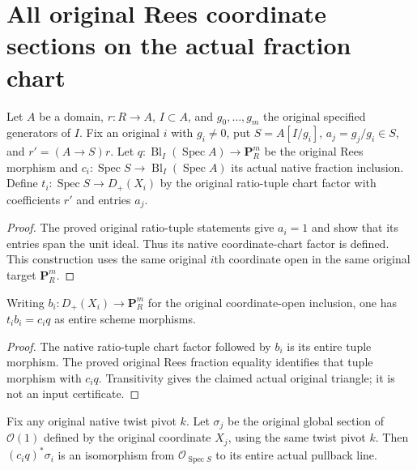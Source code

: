 \section{All original Rees coordinate sections on the actual fraction chart}
\begin{definition}
\label{def:whole-original-fraction-projective-factor}
\leanok
Let $A$ be a domain, $r:R\to A$, $I\subset A$, and $g_0,\ldots,g_m$ the original
specified generators of $I$. Fix an original $i$ with $g_i\ne0$, put
$S=A[I/g_i]$, $a_j=g_j/g_i\in S$, and $r'=(A\to S)r$.
Let $q:\operatorname{Bl}_I(\operatorname{Spec}A)\to\mathbf P_R^m$ be the original
Rees morphism and $c_i:\operatorname{Spec}S\to\operatorname{Bl}_I(\operatorname{Spec}A)$
its actual native fraction inclusion. Define $t_i:\operatorname{Spec}S\to D_+(X_i)$
by the original ratio-tuple chart factor with coefficients $r'$ and entries $a_j$.
\end{definition}
\begin{proof}
The proved original ratio-tuple statements give $a_i=1$ and show that its
entries span the unit ideal. Thus its native coordinate-chart factor is defined. This construction uses the same original $i$th coordinate
open in the same original target $\mathbf P_R^m$.
\end{proof}
\begin{proposition}
\label{prop:whole-original-fraction-projective-factor-triangle}
\leanok
Writing $b_i:D_+(X_i)\to\mathbf P_R^m$ for the original coordinate-open inclusion,
one has $t_i b_i=c_iq$ as entire scheme morphisms.
\end{proposition}
\begin{proof}
The native ratio-tuple chart factor followed by $b_i$ is its entire tuple
morphism. The proved original Rees fraction equality identifies
that tuple morphism with $c_iq$. Transitivity gives the claimed actual original
triangle; it is not an input certificate.
\end{proof}
\begin{proposition}
\label{prop:whole-original-fraction-projective-pivot-basis}
\leanok
Fix any original native twist pivot $k$. Let $\sigma_j$ be the original global
section of $\mathcal O(1)$ defined by the original coordinate $X_j$, using the
same twist pivot $k$. Then $(c_iq)^*\sigma_i$ is an isomorphism from
$\mathcal O_{\operatorname{Spec}S}$ to its entire actual pullback line.
\end{proposition}
